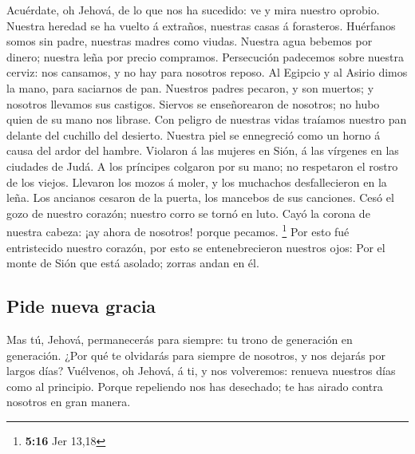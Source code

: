  Acuérdate, oh Jehová, de lo que nos ha sucedido: ve y
mira nuestro oprobio.  Nuestra heredad se ha vuelto á
extraños, nuestras casas á forasteros.  Huérfanos somos
sin padre, nuestras madres como viudas.  Nuestra agua
bebemos por dinero; nuestra leña por precio compramos. 
Persecución padecemos sobre nuestra cerviz: nos cansamos, y no hay para
nosotros reposo.  Al Egipcio y al Asirio dimos la mano,
para saciarnos de pan.  Nuestros padres pecaron, y son
muertos; y nosotros llevamos sus castigos.  Siervos se
enseñorearon de nosotros; no hubo quien de su mano nos librase.
 Con peligro de nuestras vidas traíamos nuestro pan
delante del cuchillo del desierto.  Nuestra piel se
ennegreció como un horno á causa del ardor del hambre. 
Violaron á las mujeres en Sión, á las vírgenes en las ciudades de Judá.
 A los príncipes colgaron por su mano; no respetaron el
rostro de los viejos.  Llevaron los mozos á moler, y los
muchachos desfallecieron en la leña.  Los ancianos
cesaron de la puerta, los mancebos de sus canciones. 
Cesó el gozo de nuestro corazón; nuestro corro se tornó en luto.
 Cayó la corona de nuestra cabeza: ¡ay ahora de nosotros!
porque pecamos. \footnote{\textbf{5:16} Jer 13,18}  Por
esto fué entristecido nuestro corazón, por esto se entenebrecieron
nuestros ojos:  Por el monte de Sión que está asolado;
zorras andan en él.

\hypertarget{pide-nueva-gracia}{%
\subsection{Pide nueva gracia}\label{pide-nueva-gracia}}

 Mas tú, Jehová, permanecerás para siempre: tu trono de
generación en generación.  ¿Por qué te olvidarás para
siempre de nosotros, y nos dejarás por largos días? 
Vuélvenos, oh Jehová, á ti, y nos volveremos: renueva nuestros días como
al principio.  Porque repeliendo nos has desechado; te
has airado contra nosotros en gran manera.
